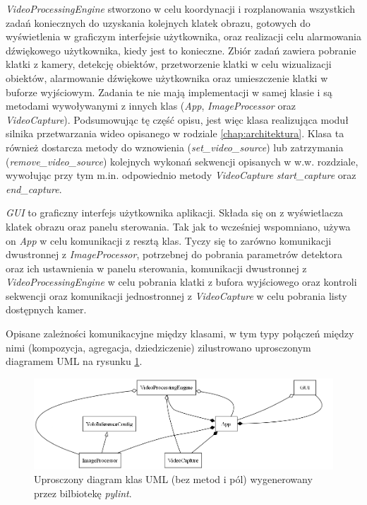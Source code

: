 \emph{VideoProcessingEngine} stworzono w celu koordynacji i rozplanowania wszystkich zadań koniecznych do uzyskania kolejnych klatek obrazu, gotowych do wyświetlenia w graficzym interfejsie użytkownika, oraz realizacji celu alarmowania dźwiękowego użytkownika, kiedy jest to konieczne. Zbiór zadań zawiera pobranie klatki z kamery, detekcję obiektów, przetworzenie klatki w celu wizualizacji obiektów, alarmowanie dźwiękowe użytkownika oraz umieszczenie klatki w buforze wyjściowym. Zadania te nie mają implementacji w samej klasie i są metodami wywoływanymi z innych klas (\emph{App}, \emph{ImageProcessor} oraz \emph{VideoCapture}).
Podsumowując tę część opisu, jest więc klasa realizująca moduł silnika przetwarzania wideo opisanego w rodziale \ref{chap:architektura}. Klasa ta również dostarcza metody do wznowienia (\emph{set\_video\_source}) lub zatrzymania (\emph{remove\_video\_source}) kolejnych wykonań sekwencji opisanych w w.w. rozdziale, wywołując przy tym m.in. odpowiednio metody \emph{VideoCapture} \emph{start\_capture} oraz \emph{end\_capture}.  

\emph{GUI} to graficzny interfejs użytkownika aplikacji. Składa się on z wyświetlacza klatek obrazu oraz panelu sterowania. Tak jak to wcześniej wspomniano, używa on \emph{App} w celu komunikacji z resztą klas. Tyczy się to zarówno komunikacji dwustronnej z \emph{ImageProcessor}, potrzebnej do pobrania parametrów detektora oraz ich ustawnienia w panelu sterowania, komunikacji dwustronnej z \emph{VideoProcessingEngine} w celu pobrania klatki z bufora wyjściowego oraz kontroli sekwencji oraz komunikacji jednostronnej z \emph{VideoCapture} w celu pobrania listy dostępnych kamer.

Opisane zależności komunikacyjne między klasami, w tym typy połączeń między nimi (kompozycja, agregacja, dziedziczenie) zilustrowano uprosczonym diagramem UML na rysunku \ref{fig:uprosczony-diagram-klas}. 

\begin{figure}[H]
    \centering
    \includegraphics[width=\linewidth]{r_implementacja/klasy/simplified_classes.png}
    \caption{Uprosczony diagram klas UML (bez metod i pól) wygenerowany przez bilbiotekę \emph{pylint}.}
    \label{fig:uprosczony-diagram-klas}
\end{figure}

